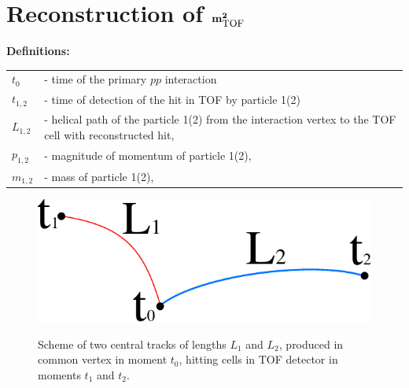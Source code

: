 
\chapter{Reconstruction of \texorpdfstring{$\bf{m}^{2}_{\text{\small TOF}}$}{mTOF^2}}\label{appendix:squaredMass}


\textbf{Definitions:}\\[7pt]
\begin{tabular}{ll}
$t_{0}$ &- time of the primary $pp$ interaction\\
$t_{1,2}$ &- time of detection of the hit in TOF by particle 1(2)\\
$L_{1,2}$ & - helical path of the particle 1(2) from the interaction vertex to the TOF cell with reconstructed hit,\\
$p_{1,2}$ & - magnitude of momentum of particle 1(2),\\
$m_{1,2}$ & - mass of particle 1(2),\\
\end{tabular}\vspace{10pt}


\begin{figure}[ht!]
\centering%
\parbox{0.29\textwidth}{%
  \centering%
  \includegraphics[width=\linewidth]{graphics/eventSelection/TofScheme.pdf}\label{fig:tofScheme}
}%
\quad\quad%
\parbox{0.655\textwidth}{%
    \caption[Scheme of two central tracks with common vertex, hitting cells in TOF detector.]{Scheme of two central tracks of lengths $L_{1}$ and $L_{2}$, produced in common vertex in moment $t_{0}$, hitting cells in TOF detector in moments $t_{1}$ and $t_{2}$.}
}%

\end{figure}


